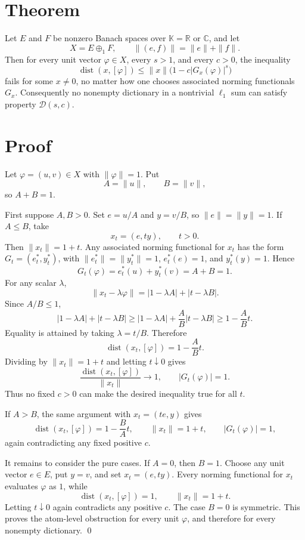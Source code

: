 \documentclass[11pt]{amsart}
\begin{document}
\section*{Theorem}

Let \(E\) and \(F\) be nonzero Banach spaces over \(\mathbb K=\mathbb R\) or
\(\mathbb C\), and let
\[
  X = E\oplus_1 F,\qquad \|(e,f)\|=\|e\|+\|f\|.
\]
Then for every unit vector \(\varphi\in X\), every \(s>1\), and every \(c>0\),
the inequality
\[
  \operatorname{dist}(x,[\varphi])
  \leq \|x\|\bigl(1-c |G_x(\varphi)|^s\bigr)
\]
fails for some \(x\neq 0\), no matter how one chooses associated norming
functionals \(G_x\). Consequently no nonempty dictionary in a nontrivial
\(\ell_1\) sum can satisfy property \(\mathcal D(s,c)\).

\section*{Proof}

Let \(\varphi=(u,v)\in X\) with \(\|\varphi\|=1\). Put
\[
  A=\|u\|,\qquad B=\|v\|,
\]
so \(A+B=1\).

First suppose \(A,B>0\). Set \(e=u/A\) and \(y=v/B\), so
\(\|e\|=\|y\|=1\). If \(A\leq B\), take
\[
  x_t=(e,t y),\qquad t>0.
\]
Then \(\|x_t\|=1+t\). Any associated norming functional for \(x_t\) has the
form \(G_t=(e_t^*,y_t^*)\), with \(\|e_t^*\|=\|y_t^*\|=1\),
\(e_t^*(e)=1\), and \(y_t^*(y)=1\). Hence
\[
  G_t(\varphi)=e_t^*(u)+y_t^*(v)=A+B=1.
\]
For any scalar \(\lambda\),
\[
  \|x_t-\lambda\varphi\|
  = |1-\lambda A| + |t-\lambda B|.
\]
Since \(A/B\leq 1\),
\[
  |1-\lambda A|+|t-\lambda B|
  \geq |1-\lambda A|+\frac AB |t-\lambda B|
  \geq 1-\frac AB t.
\]
Equality is attained by taking \(\lambda=t/B\). Therefore
\[
  \operatorname{dist}(x_t,[\varphi])=1-\frac AB t.
\]
Dividing by \(\|x_t\|=1+t\) and letting \(t\downarrow 0\) gives
\[
  \frac{\operatorname{dist}(x_t,[\varphi])}{\|x_t\|}\longrightarrow 1,
  \qquad |G_t(\varphi)|=1.
\]
Thus no fixed \(c>0\) can make the desired inequality true for all \(t\).

If \(A>B\), the same argument with \(x_t=(t e,y)\) gives
\[
  \operatorname{dist}(x_t,[\varphi])=1-\frac BA t,\qquad
  \|x_t\|=1+t,\qquad |G_t(\varphi)|=1,
\]
again contradicting any fixed positive \(c\).

It remains to consider the pure cases. If \(A=0\), then \(B=1\). Choose any
unit vector \(e\in E\), put \(y=v\), and set \(x_t=(e,t y)\). Every norming
functional for \(x_t\) evaluates \(\varphi\) as \(1\), while
\[
  \operatorname{dist}(x_t,[\varphi])=1,\qquad \|x_t\|=1+t.
\]
Letting \(t\downarrow0\) again contradicts any positive \(c\). The case
\(B=0\) is symmetric. This proves the atom-level obstruction for every unit
\(\varphi\), and therefore for every nonempty dictionary.
\qed
\end{document}
